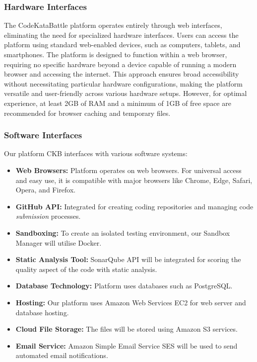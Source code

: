 \subsubsection{Hardware Interfaces}
The CodeKataBattle platform operates entirely through web interfaces, eliminating the need for specialized hardware interfaces. Users can access the platform using standard web-enabled devices, such as computers, tablets, and smartphones. The platform is designed to function within a web browser, requiring no specific hardware beyond a device capable of running a modern browser and accessing the internet. This approach ensures broad accessibility without necessitating particular hardware configurations, making the platform versatile and user-friendly across various hardware setups. However, for optimal experience, at least 2GB of RAM and a minimum of 1GB of free space are recommended for browser caching and temporary files.

\subsubsection{Software Interfaces}
Our platform CKB interfaces with various software systems:

\begin{itemize}
    \item \textbf{Web Browsers:} Platform operates on web browsers. For universal access and easy use, it is compatible with major browsers like Chrome, Edge, Safari, Opera, and Firefox.

    \item \textbf{GitHub API:} Integrated for creating coding repositories and managing code \textit{submission} processes.

    \item \textbf{Sandboxing:} To create an isolated testing environment, our Sandbox Manager will utilise Docker.

    \item \textbf{Static Analysis Tool:} SonarQube API will be integrated for scoring the quality aspect of the code with static analysis. 

    \item \textbf{Database Technology:} Platform uses databases such as PostgreSQL.

    \item \textbf{Hosting:} Our platform uses Amazon Web Services EC2 for web server and database hosting.

    \item \textbf{Cloud File Storage:} The files will be stored using Amazon S3 services.

    \item \textbf{Email Service:} Amazon Simple Email Service SES will be used to send automated email notifications.
\end{itemize}

